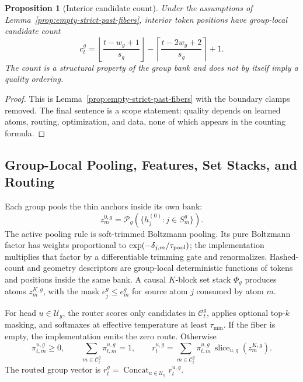 \documentclass{article}
\theoremstyle{plain}
\newtheorem{proposition}[theorem]{Proposition}
\theoremstyle{definition}
\theoremstyle{remark}
\begin{document}
\begin{proposition}[Interior candidate count]
\label{prop:interior-candidate-count}
Under the assumptions of Lemma~\ref{prop:empty-strict-past-fibers}, interior token positions have group-local candidate count
\begin{equation}
c_t^g=\left\lfloor\frac{t-w_g+1}{s_g}\right\rfloor-
\left\lceil\frac{t-2w_g+2}{s_g}\right\rceil+1.
\end{equation}
The count is a structural property of the group bank and does not by itself imply a quality ordering.
\end{proposition}

\begin{proof}
This is Lemma~\ref{prop:empty-strict-past-fibers} with the boundary clamps removed.  The final sentence is a scope statement: quality depends on learned atoms, routing, optimization, and data, none of which appears in the counting formula.
\end{proof}

\subsection{Group-Local Pooling, Features, Set Stacks, and Routing}
\label{sec:mrp6-group-local}

Each group pools the thin anchors inside its own bank:
\begin{equation}
z_m^{0,g}=\mathcal P_g(\{h_j^{(0)}:j\in S_m^g\}).
\end{equation}
The active pooling rule is soft-trimmed Boltzmann pooling.  Its pure Boltzmann factor has weights proportional to $\exp(-\delta_{j,m}/\tau_{\rm pool})$; the implementation multiplies that factor by a differentiable trimming gate and renormalizes.  Hashed-count and geometry descriptors are group-local deterministic functions of tokens and positions inside the same bank.  A causal $K$-block set stack $\Phi_g$ produces atoms $z_m^{K,g}$, with the mask $e_j^g\le e_m^g$ for source atom $j$ consumed by atom $m$.

For head $u\in\mathcal U_g$, the router scores only candidates in $\mathcal C_t^g$, applies optional top-$k$ masking, and softmaxes at effective temperature at least $\tau_{\min}$.  If the fiber is empty, the implementation emits the zero route.  Otherwise
\begin{equation}
\pi_{t,m}^{u,g}\ge0,
\qquad
\sum_{m\in\mathcal C_t^g}\pi_{t,m}^{u,g}=1,
\qquad
r_t^{u,g}=\sum_{m\in\mathcal C_t^g}\pi_{t,m}^{u,g}\,\operatorname{slice}_{u,g}(z_m^{K,g}).
\end{equation}
The routed group vector is $r_t^g=\operatorname{Concat}_{u\in\mathcal U_g}r_t^{u,g}$.
\end{document}
